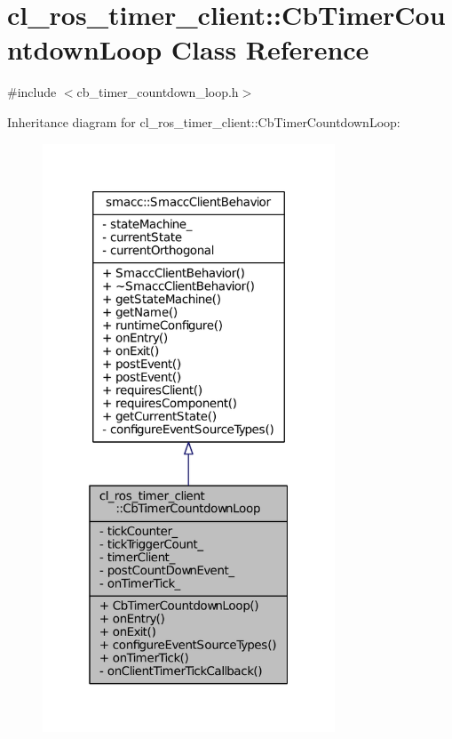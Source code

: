 \hypertarget{classcl__ros__timer__client_1_1CbTimerCountdownLoop}{}\section{cl\+\_\+ros\+\_\+timer\+\_\+client\+:\+:Cb\+Timer\+Countdown\+Loop Class Reference}
\label{classcl__ros__timer__client_1_1CbTimerCountdownLoop}


{\ttfamily \#include $<$cb\+\_\+timer\+\_\+countdown\+\_\+loop.\+h$>$}



Inheritance diagram for cl\+\_\+ros\+\_\+timer\+\_\+client\+:\+:Cb\+Timer\+Countdown\+Loop\+:
\nopagebreak
\begin{figure}[H]
\begin{center}
\leavevmode
\includegraphics[width=247pt]{classcl__ros__timer__client_1_1CbTimerCountdownLoop__inherit__graph}
\end{center}
\end{figure}


